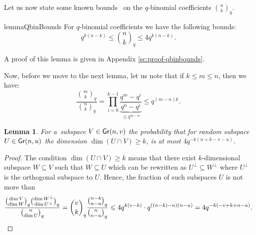 \documentclass[11pt]{article}
\let\le\leqslant
\let\ge\geqslant
\theoremstyle{plain}
\newtheorem{lemma}{Lemma}
\theoremstyle{definition}
\theoremstyle{remark}
\newcommand{\Gr}{{\sf Gr}}
\newcommand{\qbin}[2]{\binom{#1}{#2}_{\! q}}
\begin{document}
Let us now state some known bounds~\cite[Lemma~4]{Koetter:2008} on the $q$-binomial coefficients $\qbin{n}{k}$. 
\begin{restatable}{lemma}{QbinBounds}\label{lemma:qbinbounds}
    For $q$-binomial coefficients we have the following bounds:
    $$q^{k(n-k)}\le \qbin{n}{k}\le 4q^{k(n-k)}.$$
\end{restatable}
\noindent A proof of this lemma is given in Appendix \ref{sc:proof-qbinbounds}.

Now, before we move to the next lemma, let us note that if $k\le m\le n$, then we have:
$$\frac{\binom{m}{k}_q}{\binom{n}{k}_q}=\prod_{i=0}^{k-1}\underbrace{\frac{q^m-q^i}{q^n-q^i}}_{\le q^{m-n}}\le q^{(m-n)k}.$$

\begin{lemma}\label{lemma:subsp-prob}
    For a~subspace $V\in \Gr(n, v)$ the probability that for random subspace $U\in \Gr(n,u)$ the dimension $\dim (U\cap V)\ge k$, is at most $4q^{-k(n+k-v-u)}$.
\end{lemma}
\begin{proof}
    The condition $\dim(U\cap V)\ge k$ means that there exist $k$-dimensional subspace $W\subseteq V$ such that $W\subseteq U$ which can be rewritten as $U^\perp\subseteq W^\perp$ where $U^\perp$ is the orthogonal subspace to $U$. Hence, the fraction of such subspaces $U$ is not more than
    \begin{equation*}
    \frac{\binom{\dim V}{\dim W}_q \binom{\dim W^\perp}{\dim U^\perp}_q}{\binom{n}{\dim U}_q}
    = \binom{v}{k}_q\frac{\binom{n-k}{n-u}_q}{\binom{n}{n-u}_q} \le 4q^{k(v-k)}\cdot q^{((n-k)-n)(n-u)}=4q^{-k(-v+k+n-u)}.\qedhere
    \end{equation*}
\end{proof}
\end{document}
